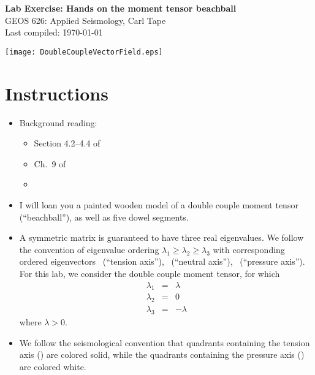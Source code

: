 \documentclass[11pt,titlepage,fleqn]{article}
\begin{document}

\begin{spacing}{1.2}
\centering
{\large \bf Lab Exercise: Hands on the moment tensor beachball} \\
GEOS 626: Applied Seismology, Carl Tape \\
Last compiled: \today \\
\end{spacing}


\vspace{-4.4cm}
\begin{center}
\texttt{[image: DoubleCoupleVectorField.eps]}
\end{center}


\vspace{-1.8cm}
\section*{Instructions}

\begin{itemize}
\item Background reading:
%
\begin{itemize}
\item Section 4.2--4.4 of \citet{SteinWysession}
\item Ch.~9 of \citet{ShearerE2}
\item \citet{TapeTape2012beach}
\end{itemize}

\item I will loan you a painted wooden model of a double couple moment tensor (``beachball''), as well as five dowel segments.

\item A symmetric matrix is guaranteed to have three real eigenvalues. We follow the convention of eigenvalue ordering $\lambda_1 \ge \lambda_2 \ge \lambda_3$ with corresponding ordered eigenvectors \mbT\ (``tension axis''), \mbB\ (``neutral axis''), \mbP\ (``pressure axis''). For this lab, we consider the double couple moment tensor, for which
%
\begin{eqnarray*}
\lambda_1 &=& \lambda
\\
\lambda_2 &=& 0
\\
\lambda_3 &=& -\lambda
\end{eqnarray*}
%
where $\lambda > 0$.

\item We follow the seismological convention that quadrants containing the tension axis (\mbT) are colored solid, while the quadrants containing the pressure axis (\mbP) are colored white.
\end{itemize}
\end{document}
